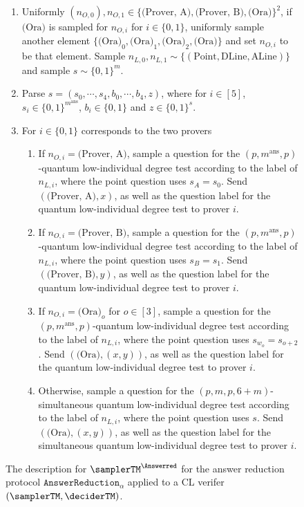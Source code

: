 \begin{figure}[!htbp]
\begin{gamespec}
\begin{enumerate}
			\item Uniformly $(n_{O,0}), n_{O, 1} \in \{ \text{(Prover, A)}, \text{(Prover, B)},  \text{(Ora)} \}^2$, if $\text{(Ora)}$ is sampled for $n_{O,i}$ for $i \in \{0,1\}$, uniformly sample another element $\{\text{(Ora)}_0, \text{(Ora)}_1,\text{(Ora)}_2, \text{(Ora)}\}$ and set $n_{O,i}$ to be that element. Sample $n_{L,0}, n_{L, 1} \sim \{(\text{Point}, \text{DLine}, \text{ALine})\}$ and sample $s \sim \{0,1\}^m$.
			\item Parse $s =(s_0, \cdots, s_4, b_0, \cdots, b_4, z)$, where for $i \in [5]$, $s_i \in \{0,1\}^{m^{\text{ans}}}$,  $b_i \in \{0,1\}$ and $z \in \{0,1\}^s$. 
			\item For $i \in \{0,1\}$ corresponds to the two provers
			\begin{enumerate}
				\item If $n_{O,i} =  \text{(Prover, A)}$, sample a question for the $(p, m^{\text{ans}},p)$-quantum low-individual degree test according to the label of $n_{L,i}$, where the point question uses $s_A = s_0$. Send $(\text{(Prover, A)}, x)$, as well as the question label for the quantum low-individual degree test to prover $i$.
				\item If $n_{O,i} =  \text{(Prover, B)}$, sample a question for the $(p, m^{\text{ans}},p)$-quantum low-individual degree test according to the label of $n_{L,i}$, where the point question uses $s_B = s_1$. Send $(\text{(Prover, B)}, y)$, as well as the question label for the quantum low-individual degree test to prover $i$.
				\item If $n_{O,i} =  \text{(Ora)}_o$ for $o \in [3]$, sample a question for the $(p, m^{\text{ans}},p)$-quantum low-individual degree test according to the label of $n_{L,i}$, where the point question uses $s_{w_o} = s_{o+2}$. Send $(\text{(Ora)}, (x,y))$, as well as the question label for the quantum low-individual degree test to prover $i$.
				\item Otherwise, sample a question for the $(p, m,p, 6+m)$-simultaneous quantum low-individual degree test according to the label of $n_{L,i}$, where the point question uses $s$. Send $(\text{(Ora)}, (x,y))$, as well as the question label for the simultaneous quantum low-individual degree test to prover $i$.
			\end{enumerate}
		\end{enumerate}
		
	\end{gamespec}
	\caption{\footnotesize The description for $\samplerTM^{\Answerred}$ for the answer reduction protocol $\texttt{AnswerReduction}_{\alpha}$ applied to a CL verifer $(\samplerTM, \deciderTM)$.  }
	\label{fig:Answerredsample}
\end{figure}

